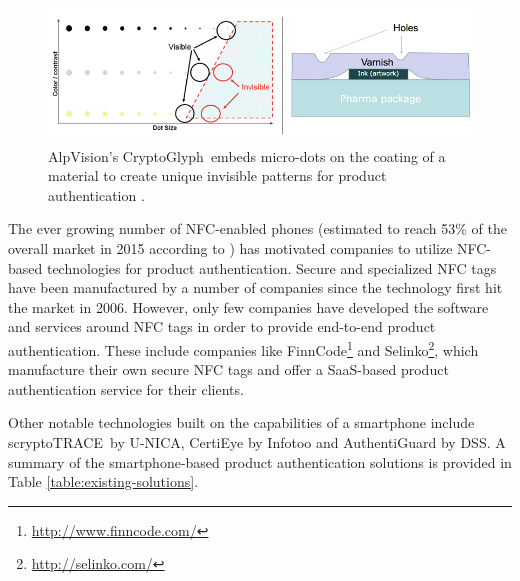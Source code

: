 \documentclass[thesis.tex]{subfiles}
\begin{document}
\begin{figure}[hb]
\centering \includegraphics[width=\textwidth]{images/existing_solutions/cryptoglyph}
\caption{AlpVision's CryptoGlyph\textregistered\ embeds micro-dots on the coating of a material to create unique invisible patterns for product authentication \cite{alpvision}. \label{figure:alpvision}}
\end{figure}

The ever growing number of NFC-enabled phones (estimated to reach 53\% of the overall market in 2015 according to \cite{frost-sullivan}) has motivated companies to utilize NFC-based technologies for product authentication. Secure and specialized NFC tags have been manufactured by a number of companies since the technology first hit the market in 2006. However, only few companies have developed the software and services around NFC tags in order to provide end-to-end product authentication. These include companies like FinnCode\footnote{\url{http://www.finncode.com/}} and Selinko\footnote{\url{http://selinko.com/}}, which manufacture their own secure NFC tags and offer a SaaS-based product authentication service for their clients.

Other notable technologies built on the capabilities of a smartphone include scryptoTRACE\textregistered\ by U-NICA, CertiEye by Infotoo and AuthentiGuard by DSS. A summary of the smartphone-based product authentication solutions is provided in Table \ref{table:existing-solutions}.
\end{document}
